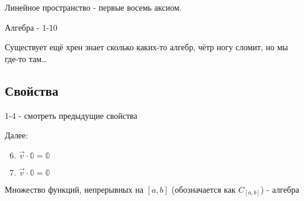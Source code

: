 \documentclass[12pt, a4paper]{article}
\begin{document}
    Линейное пространство - первые восемь аксиом.
    
    Алгебра - 1-10

    Существует ещё хрен знает сколько каких-то алгебр, чётр ногу сломит, но мы где-то там\dots

    \subsection{Свойства}

    1-4 - смотреть предыдущие свойства

    Далее:
    \begin{enumerate}
        \setcounter{enumi}{5}
        \item $\vec{v} \cdot \mathbb{0} = \mathbb{0}$
        \item $\vec{v} \cdot \mathbb{0} = \mathbb{0}$
    \end{enumerate}

    \begin{example}
        Множество функций, непрерывных на $[a, b]$ (обозначается как $C_{[a, b]}$) - алгебра
    \end{example}
\end{document}
